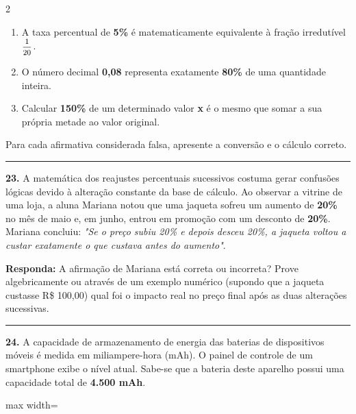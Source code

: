 \documentclass[twoside, 10pt, a4paper]{article}
\newlength{\espacoPreQuestao}
\newlength{\espacoQuestao}
\begin{document}
\begin{multicols*}{2}
\begin{enumerate}[label=\Roman*.]
    \item A taxa percentual de \textbf{5\%} é matematicamente equivalente à fração irredutível $ \mfrac{1}{20} $.
    \item O número decimal \textbf{0,08} representa exatamente \textbf{80\%} de uma quantidade inteira.
    \item Calcular \textbf{150\%} de um determinado valor \textbf{x} é o mesmo que somar a sua própria metade ao valor original.
\end{enumerate}
Para cada afirmativa considerada falsa, apresente a conversão e o cálculo correto.
\par\vspace{\espacoQuestao}

\noindent\textcolor{CorLinha}{\rule{\linewidth}{0.5pt}}
\par\vspace{\espacoPreQuestao}
\textbf{23.} A matemática dos reajustes percentuais sucessivos costuma gerar confusões lógicas devido à alteração constante da base de cálculo. Ao observar a vitrine de uma loja, a aluna Mariana notou que uma jaqueta sofreu um aumento de \textbf{20\%} no mês de maio e, em junho, entrou em promoção com um desconto de \textbf{20\%}.
Mariana concluiu: \textit{"Se o preço subiu 20\% e depois desceu 20\%, a jaqueta voltou a custar exatamente o que custava antes do aumento"}.
\begin{boxresponda}
\textbf{Responda:} A afirmação de Mariana está correta ou incorreta? Prove algebricamente ou através de um exemplo numérico (supondo que a jaqueta custasse R\$ 100,00) qual foi o impacto real no preço final após as duas alterações sucessivas.
\end{boxresponda}
\par\vspace{\espacoQuestao}

\noindent\textcolor{CorLinha}{\rule{\linewidth}{0.5pt}} 
\par\vspace{\espacoPreQuestao}
\textbf{24.} A capacidade de armazenamento de energia das baterias de dispositivos móveis é medida em miliampere-hora (mAh). O painel de controle de um smartphone exibe o nível atual. Sabe-se que a bateria deste aparelho possui uma capacidade total de \textbf{4.500 mAh}.

\begin{center}
\begin{adjustbox}{max width=\linewidth}
\end{adjustbox}
\end{center}
\end{multicols*}
\end{document}
